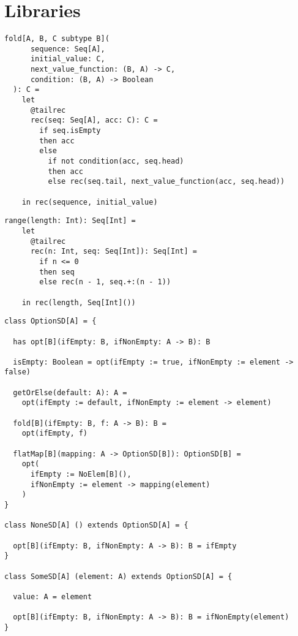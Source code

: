 \chapter{Libraries}

\begin{lstlisting}[label={lst:fold}]
  fold[A, B, C subtype B](
      sequence: Seq[A],
      initial_value: C,
      next_value_function: (B, A) -> C,
      condition: (B, A) -> Boolean
  ): C =
    let
      @tailrec
      rec(seq: Seq[A], acc: C): C =
        if seq.isEmpty
        then acc
        else
          if not condition(acc, seq.head)
          then acc
          else rec(seq.tail, next_value_function(acc, seq.head))

    in rec(sequence, initial_value)
\end{lstlisting}

\begin{lstlisting}[label={lst:range}]
  range(length: Int): Seq[Int] =
    let
      @tailrec
      rec(n: Int, seq: Seq[Int]): Seq[Int] =
        if n <= 0
        then seq
        else rec(n - 1, seq.+:(n - 1))

    in rec(length, Seq[Int]())
\end{lstlisting}


\begin{lstlisting}[label={lst:option}]
class OptionSD[A] = {

  has opt[B](ifEmpty: B, ifNonEmpty: A -> B): B

  isEmpty: Boolean = opt(ifEmpty := true, ifNonEmpty := element -> false)

  getOrElse(default: A): A =
    opt(ifEmpty := default, ifNonEmpty := element -> element)

  fold[B](ifEmpty: B, f: A -> B): B =
    opt(ifEmpty, f)

  flatMap[B](mapping: A -> OptionSD[B]): OptionSD[B] =
    opt(
      ifEmpty := NoElem[B](),
      ifNonEmpty := element -> mapping(element)
    )
}

class NoneSD[A] () extends OptionSD[A] = {

  opt[B](ifEmpty: B, ifNonEmpty: A -> B): B = ifEmpty
}

class SomeSD[A] (element: A) extends OptionSD[A] = {

  value: A = element

  opt[B](ifEmpty: B, ifNonEmpty: A -> B): B = ifNonEmpty(element)
}
\end{lstlisting}

